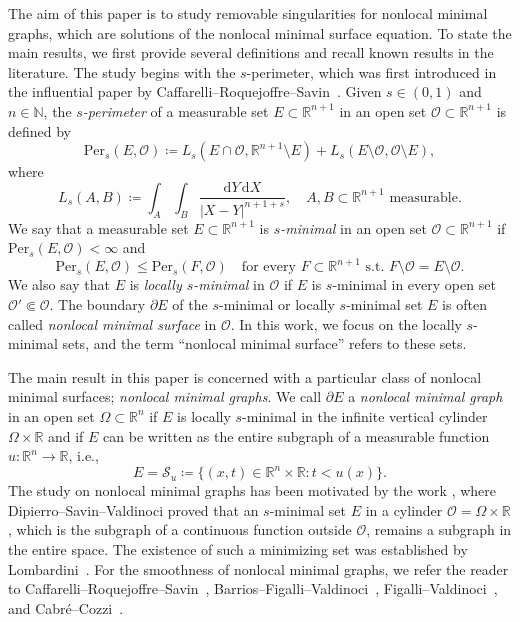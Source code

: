 \documentclass{amsart}
\theoremstyle{plain}
\theoremstyle{definition}
\numberwithin{equation}{section}
\begin{document}
The aim of this paper is to study removable singularities for nonlocal minimal graphs, which are solutions of the nonlocal minimal surface equation. To state the main results, we first provide several definitions and recall known results in the literature. The study begins with the $s$-perimeter, which was first introduced in the influential paper by Caffarelli--Roquejoffre--Savin~\cite{CRS10}. Given $s \in (0,1)$ and $n \in \mathbb{N}$, the \emph{$s$-perimeter} of a measurable set $E \subset \mathbb{R}^{n+1}$ in an open set $\mathcal{O} \subset \mathbb{R}^{n+1}$ is defined by
\begin{equation*}
\mathrm{Per}_s(E, \mathcal{O}) \coloneqq L_s(E \cap \mathcal{O}, \mathbb{R}^{n+1} \setminus E) + L_s(E \setminus \mathcal{O}, \mathcal{O} \setminus E),
\end{equation*}
where
\begin{equation*}
L_s(A, B) \coloneqq \int_A \int_B \frac{\mathrm{d}Y \,\mathrm{d}X}{|X-Y|^{n+1+s}}, \quad A, B \subset \mathbb{R}^{n+1}\text{ measurable}.
\end{equation*}
We say that a measurable set $E \subset \mathbb{R}^{n+1}$ is \emph{$s$-minimal} in an open set $\mathcal{O} \subset \mathbb{R}^{n+1}$ if $\mathrm{Per}_s(E, \mathcal{O})< \infty$ and
\begin{equation*}
\mathrm{Per}_s(E, \mathcal{O}) \leq \mathrm{Per}_s(F, \mathcal{O}) \quad\text{for every }F \subset \mathbb{R}^{n+1} \text{ s.t.~}F\setminus \mathcal{O} = E \setminus \mathcal{O}.
\end{equation*}
We also say that $E$ is \emph{locally $s$-minimal} in $\mathcal{O}$ if $E$ is $s$-minimal in every open set $\mathcal{O}' \Subset \mathcal{O}$. The boundary $\partial E$ of the $s$-minimal or locally $s$-minimal set $E$ is often called \emph{nonlocal minimal surface} in $\mathcal{O}$. In this work, we focus on the locally $s$-minimal sets, and the term ``nonlocal minimal surface'' refers to these sets.

The main result in this paper is concerned with a particular class of nonlocal minimal surfaces; \emph{nonlocal minimal graphs}. We call $\partial E$ a \emph{nonlocal minimal graph} in an open set $\Omega \subset \mathbb{R}^n$ if $E$ is locally $s$-minimal in the infinite vertical cylinder $\Omega \times \mathbb{R}$ and if $E$ can be written as the entire subgraph of a measurable function $u: \mathbb{R}^n \to \mathbb{R}$, i.e.,
\begin{equation*}
E=\mathcal{S}_u \coloneqq \{(x, t) \in \mathbb{R}^n \times \mathbb{R}: t<u(x) \}.
\end{equation*}
The study on nonlocal minimal graphs has been motivated by the work \cite{DSV16}, where Dipierro--Savin--Valdinoci proved that an $s$-minimal set $E$ in a cylinder $\mathcal{O}=\Omega \times \mathbb{R}$, which is the subgraph of a continuous function outside $\mathcal{O}$, remains a subgraph in the entire space. The existence of such a minimizing set was established by Lombardini~\cite{Lom18}. For the smoothness of nonlocal minimal graphs, we refer the reader to Caffarelli--Roquejoffre--Savin~\cite{CRS10}, Barrios--Figalli--Valdinoci~\cite{BFV14}, Figalli--Valdinoci~\cite{FV17}, and Cabr\'e--Cozzi~\cite{CC19}.
\end{document}
